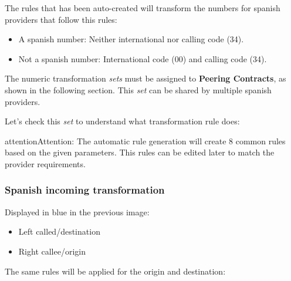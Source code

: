 \documentclass[letterpaper,10pt,english]{sphinxmanual}
\begin{document}
The rules that has been auto-created will transform the numbers for spanish
providers that follow this rules:
\begin{itemize}
\item {} 
A spanish number: Neither international nor calling code (34).

\item {} 
Not a spanish number: International code (00) and calling code (34).

\end{itemize}

The numeric transformation \emph{sets} must be assigned to \textbf{Peering Contracts}, as
shown in the following section. This \emph{set} can be shared by multiple spanish
providers.

Let's check this \emph{set} to understand what transformation rule does:

\noindent{}

\begin{notice}{attention}{Attention:}
The automatic rule generation will create 8 common rules based on
the given parameters. This rules can be edited later to match the provider
requirements.
\end{notice}


\subsubsection{Spanish incoming transformation}
\label{external_incoming_calls/numeric_transformations:spanish-incoming-transformation}
Displayed in blue in the previous image:
\begin{itemize}
\item {} 
Left called/destination

\item {} 
Right callee/origin

\end{itemize}

The same rules will be applied for the origin and destination:
\end{document}
